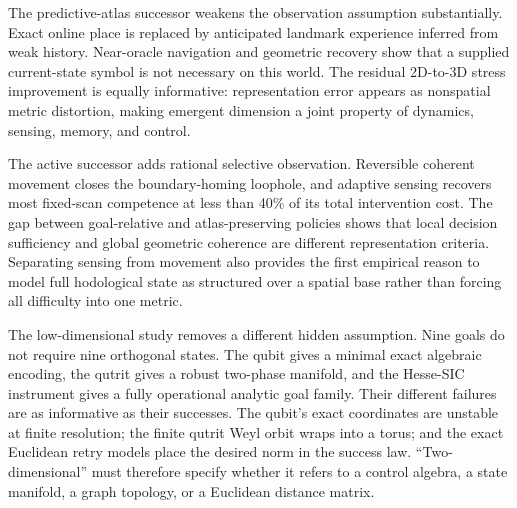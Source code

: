 \documentclass[11pt]{article}
\begin{document}
The predictive-atlas successor weakens the observation assumption
substantially. Exact online place is replaced by anticipated landmark
experience inferred from weak history. Near-oracle navigation and geometric
recovery show that a supplied current-state symbol is not necessary on this
world. The residual 2D-to-3D stress improvement is equally informative:
representation error appears as nonspatial metric distortion, making emergent
dimension a joint property of dynamics, sensing, memory, and control.

The active successor adds rational selective observation. Reversible coherent
movement closes the boundary-homing loophole, and adaptive sensing recovers
most fixed-scan competence at less than 40\% of its total intervention cost.
The gap between goal-relative and atlas-preserving policies shows that local
decision sufficiency and global geometric coherence are different
representation criteria. Separating sensing from movement also provides the
first empirical reason to model full hodological state as structured over a
spatial base rather than forcing all difficulty into one metric.

The low-dimensional study removes a different hidden assumption. Nine goals
do not require nine orthogonal states. The qubit gives a minimal exact
algebraic encoding, the qutrit gives a robust two-phase manifold, and the
Hesse-SIC instrument gives a fully operational analytic goal family. Their
different failures are as informative as their successes. The qubit's exact
coordinates are unstable at finite resolution; the finite qutrit Weyl orbit
wraps into a torus; and the exact Euclidean retry models place the desired norm
in the success law. ``Two-dimensional'' must therefore specify whether it
refers to a control algebra, a state manifold, a graph topology, or a Euclidean
distance matrix.
\end{document}
